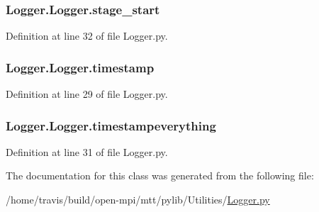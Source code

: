 \hypertarget{class_logger_1_1_logger_a639adf5e0d4f73bdb942e9652903231f}{
\subsubsection[{stage\-\_\-start}]{\setlength{\rightskip}{0pt plus 5cm}Logger.\-Logger.\-stage\-\_\-start}}\label{class_logger_1_1_logger_a639adf5e0d4f73bdb942e9652903231f}


Definition at line 32 of file Logger.\-py.

\hypertarget{class_logger_1_1_logger_af1d68b73fec8eebd0abeafa3bc8fd98b}{
\subsubsection[{timestamp}]{\setlength{\rightskip}{0pt plus 5cm}Logger.\-Logger.\-timestamp}}\label{class_logger_1_1_logger_af1d68b73fec8eebd0abeafa3bc8fd98b}


Definition at line 29 of file Logger.\-py.

\hypertarget{class_logger_1_1_logger_a6012f50ab21e5ab3b89465a972b6a99d}{
\subsubsection[{timestampeverything}]{\setlength{\rightskip}{0pt plus 5cm}Logger.\-Logger.\-timestampeverything}}\label{class_logger_1_1_logger_a6012f50ab21e5ab3b89465a972b6a99d}


Definition at line 31 of file Logger.\-py.



The documentation for this class was generated from the following file\-:\begin{DoxyCompactItemize}
\item 
/home/travis/build/open-\/mpi/mtt/pylib/\-Utilities/\hyperlink{_logger_8py}{Logger.\-py}\end{DoxyCompactItemize}
